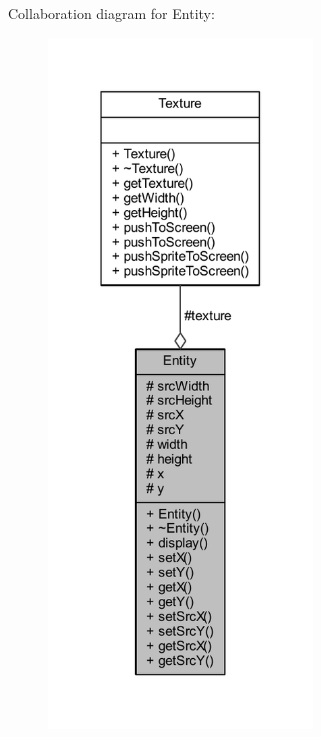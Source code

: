 Collaboration diagram for Entity\+:
\nopagebreak
\begin{figure}[H]
\begin{center}
\leavevmode
\includegraphics[width=199pt]{class_entity__coll__graph}
\end{center}
\end{figure}

